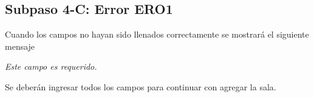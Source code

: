 \subsection{Subpaso 4-C: Error ERO1}
	Cuando los campos no hayan sido llenados correctamente
	se mostrará el siguiente mensaje \par	
	\textit{Este campo es requerido. }\par
	Se deberán ingresar todos los campos para continuar con agregar la sala.